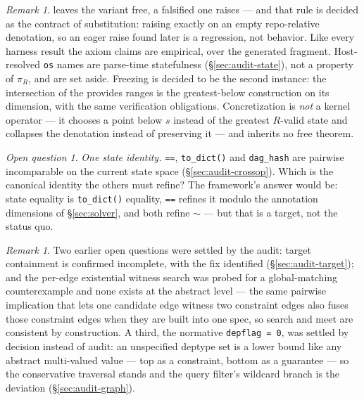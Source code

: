 \documentclass[11pt]{article}
\theoremstyle{definition}
\theoremstyle{remark}
\newtheorem{remark}[theorem]{Remark}
\newtheorem{openq}[theorem]{Open question}
\renewcommand{\ker}{\sim}
\newcommand{\code}[1]{\texttt{#1}}
\begin{document}
\begin{remark}
leaves the variant free, a falsified one raises --- and that rule is
decided as the contract of substitution: raising exactly on an empty
repo-relative denotation, so an eager raise found later is a regression,
not behavior.  Like every harness result the axiom claims are empirical,
over the generated fragment.  Host-resolved \code{os} names are parse-time statefulness
(\S\ref{sec:audit-state}), not a property of $\pi_R$, and are set aside.
Freezing is decided to be the second instance: the intersection of the
provides ranges is the greatest-below construction on its dimension, with
the same verification obligations.  Concretization is \emph{not} a kernel
operator --- it chooses a point below $s$ instead of the greatest
$R$-valid state and collapses the denotation instead of preserving it ---
and inherits no free theorem.
\end{remark}

\begin{openq}
\emph{One state identity.}  \code{==}, \code{to\_dict()} and
\code{dag\_hash} are pairwise incomparable on the current state space
(\S\ref{sec:audit-crossop}).  Which is the canonical identity the others
must refine?  The framework's answer would be: state equality is
\code{to\_dict()} equality, \code{==} refines it modulo the annotation
dimensions of \S\ref{sec:solver}, and both refine $\ker$ --- but that is a
target, not the status quo.
\end{openq}

\begin{remark}
Two earlier open questions were settled by the audit: target containment is
confirmed incomplete, with the fix identified
(\S\ref{sec:audit-target}); and the per-edge existential witness search was
probed for a global-matching counterexample and none exists at the abstract
level --- the same pairwise implication that lets one candidate edge witness
two constraint edges also fuses those constraint edges when they are built
into one spec, so search and meet are consistent by construction.  A third,
the normative \code{depflag = 0}, was settled by decision instead of audit:
an unspecified deptype set is a lower bound like any abstract multi-valued
value --- top as a constraint, bottom as a guarantee --- so the
conservative traversal stands and the query filter's wildcard branch is the
deviation (\S\ref{sec:audit-graph}).
\end{remark}

\appendix
\end{document}
